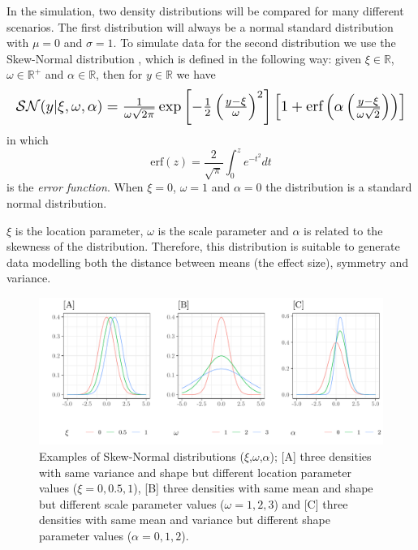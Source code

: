 \documentclass[twocolumn]{article}\usepackage[]{graphicx}\usepackage[]{xcolor}
\makeatletter
\def\maxwidth{ %
  \ifdim\Gin@nat@width>\linewidth
    \linewidth
  \else
    \Gin@nat@width
  \fi
}
\newenvironment{knitrout}{}{} %
\makeatother
\begin{document}
In the simulation, two density distributions will be compared for many different scenarios. The first distribution will always be a normal standard distribution with $\mu = 0$ and $\sigma = 1$. 
To simulate data for the second distribution we use the Skew-Normal distribution \cite{azzalini:1985}, which is defined in the following way: given $\xi \in \mathbb{R}$, $\omega \in \mathbb{R}^{+}$ and $\alpha \in \mathbb{R}$, then for $y \in \mathbb{R}$ we have  
\begin{equation}
\resizebox{\columnwidth}{!}{$
\mathcal{SN}(y|\xi, \omega, \alpha) = \frac{1}{\omega \sqrt{2\pi}} \exp \left[ -\frac{1}{2} \left( \frac{y-\xi}{\omega} \right)^2  \right] \left[ 1+ \text{erf}\left( \alpha \left( \frac{y-\xi}{\omega\sqrt{2}}\right) \right) \right]
$}
\end{equation}
in which $$\text{erf}(z) = \frac{2}{\sqrt{\pi}} \int_{0}^{z} e^{-t^2} dt $$ is the \emph{error function}.
When $\xi = 0$, $\omega = 1$ and $\alpha = 0$ the distribution is a standard normal distribution.

$\xi$ is the location parameter, $\omega$ is the scale parameter and $\alpha$ is related to the skewness of the distribution. Therefore, this distribution is suitable to generate data modelling both the distance between means (the effect size), symmetry and variance.


\begin{figure}[!h]
\begin{knitrout}
\color{fgcolor}

{\centering \includegraphics[width=\maxwidth]{figure/scenari-1} 

}


\end{knitrout}
\caption{Examples of Skew-Normal distributions ($\xi$,$\omega$,$\alpha$); [A] three densities with same variance and shape but different location parameter values ($\xi = 0, 0.5, 1$), [B] three densities with same mean and shape but different scale parameter values ($\omega = 1, 2, 3$) and [C] three densities with same mean and variance but different shape parameter values ($\alpha = 0, 1, 2$). \label{fig:scenari}}
\end{figure}
\end{document}

